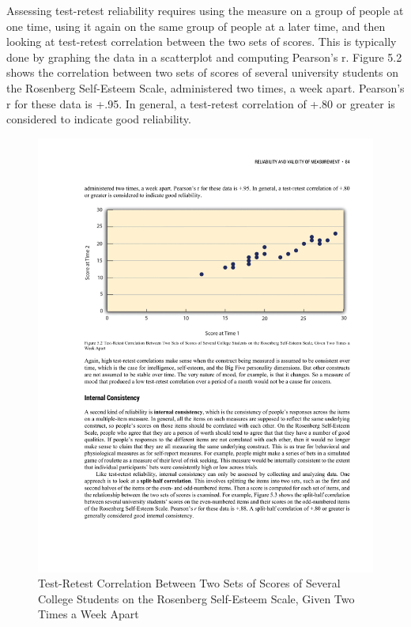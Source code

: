 Assessing test-retest reliability requires using the measure on a group of people at one time, using it again on the same group of people at a later time, and then looking at test-retest correlation between the two sets of scores. This is typically done by graphing the data in a scatterplot and computing Pearson's r. Figure 5.2 shows the correlation between two sets of scores of several university students on the Rosenberg Self-Esteem Scale, administered two times, a week apart. Pearson's r for these data is +.95. In general, a test-retest correlation of +.80 or greater is considered to indicate good reliability.

\begin{figure}
      \includegraphics[width=\linewidth]{figures/C5testretest.pdf}
      \caption{Test-Retest Correlation Between Two Sets of Scores of Several College Students on the Rosenberg Self-Esteem Scale, Given Two Times a Week Apart}
      \label{fig:testretest}
\end{figure}

